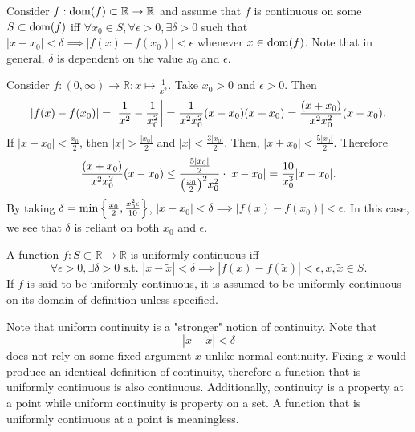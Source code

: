 \documentclass[../notes.tex]{subfiles}
\begin{document}
\begin{remark}
    Consider $f : \operatorname{dom}(f) \subset \mathbb{R} \to \mathbb{R}$ and assume that $f$ is continuous on some $S \subset \operatorname{dom}(f)$ iff $\forall x_0 \in S, \forall \epsilon > 0, \exists \delta > 0$ such that $|x - x_0| < \delta \implies |f(x) - f(x_0)| < \epsilon$ whenever $x \in \operatorname{dom}(f)$. Note that in general, $\delta$ is dependent on the value $x_0$ and $\epsilon$. 
\end{remark}
\begin{example}
    Consider $f : (0, \infty) \to \mathbb{R} : x \mapsto \frac{1}{x^2}$. Take $x_0 > 0$ and $\epsilon > 0$. Then
    \[
        \qty|f(x) - f(x_0)| = \qty|\frac{1}{x^2} - \frac{1}{x_0^2}| = \frac{1}{x^2 x_0^2} (x-x_0)(x+x_0) = \frac{(x+x_0)}{x^2 x_0^2} (x - x_0)
    .\]
    If $|x - x_0| < \frac{x_0}{2}$, then $|x| > \frac{|x_0|}{2}$ and $|x| < \frac{3|x_0|}{2}$. Then, $|x + x_0| < \frac{5|x_0|}{2}$. Therefore
    \[
        \frac{(x+x_0)}{x^2 x_0^2} (x - x_0) \leq \frac{\frac{5|x_0|}{2}}{\qty(\frac{x_0}{2})^2 x_0^2} \cdot |x - x_0| = \frac{10}{x_0^3} |x - x_0|
    .\]
    By taking $\delta = \min\qty{\frac{x_0}{2}, \frac{x_0^2 \epsilon}{10}}$, $|x - x_0| < \delta \implies |f(x) - f(x_0)| < \epsilon$. In this case, we see that $\delta$ is reliant on both $x_0$ and $\epsilon$.
\end{example}

\begin{definition}
    A function $f : S \subset \mathbb{R} \to \mathbb{R}$ is uniformly continuous iff 
    \[
        \forall \epsilon > 0, \exists \delta > 0 \text{ s.t. } |x-\tilde{x}| < \delta \implies |f(x) - f(\tilde{x})| < \epsilon, x,\tilde{x} \in S
    .\]
    If $f$ is said to be uniformly continuous, it is assumed to be uniformly continuous on its domain of definition unless specified.
\end{definition}

\begin{remark}
    Note that uniform continuity is a "stronger" notion of continuity. Note that
    \[
        |x - \tilde{x}| < \delta
    \]
    does not rely on some fixed argument $\tilde{x}$ unlike normal continuity. Fixing $\tilde{x}$ would produce an identical definition of continuity, therefore a function that is uniformly continuous is also continuous. Additionally, continuity is a property at a point while uniform continuity is property on a set. A function that is uniformly continuous at a point is meaningless.
\end{remark}
\end{document}
